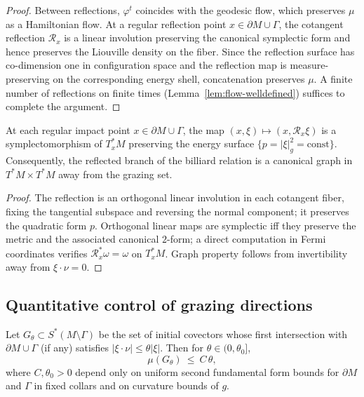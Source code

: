 \begin{proof}
Between reflections, $\varphi^t$ coincides with the geodesic flow, which preserves $\mu$ as a Hamiltonian flow. At a regular reflection point $x\in \partial M\cup\Gamma$, the cotangent reflection $\mathcal R_x$ is a linear involution preserving the canonical symplectic form and hence preserves the Liouville density on the fiber. Since the reflection surface has co-dimension one in configuration space and the reflection map is measure-preserving on the corresponding energy shell, concatenation preserves $\mu$. A finite number of reflections on finite times (Lemma~\ref{lem:flow-welldefined}) suffices to complete the argument.
\end{proof}

\begin{lemma}
\label{lem:sympl-reflection}
At each regular impact point $x\in \partial M\cup\Gamma$, the map $(x,\xi)\mapsto (x,\mathcal R_x\xi)$ is a symplectomorphism of $T_x^*M$ preserving the energy surface $\{p=|\xi|_g^2=\text{const}\}$. Consequently, the reflected branch of the billiard relation is a canonical graph in $T^*M\times T^*M$ away from the grazing set.
\end{lemma}

\begin{proof}
The reflection is an orthogonal linear involution in each cotangent fiber, fixing the tangential subspace and reversing the normal component; it preserves the quadratic form $p$. Orthogonal linear maps are symplectic iff they preserve the metric and the associated canonical $2$-form; a direct computation in Fermi coordinates verifies $\mathcal R_x^\ast\omega=\omega$ on $T_x^*M$. Graph property follows from invertibility away from $\xi\cdot\nu=0$.
\end{proof}

\subsection{Quantitative control of grazing directions}
\begin{lemma}
\label{lem:quant-grazing}
Let $G_\theta\subset S^*(M\setminus\Gamma)$ be the set of initial covectors whose first intersection with $\partial M\cup\Gamma$ (if any) satisfies $|\xi\cdot\nu|\le \theta|\xi|$.
Then for $\theta\in(0,\theta_0]$,
\[
\mu(G_\theta)\ \le\ C\,\theta,
\]
where $C,\theta_0>0$ depend only on uniform second fundamental form bounds for $\partial M$ and $\Gamma$ in fixed collars and on curvature bounds of $g$.
\end{lemma}


